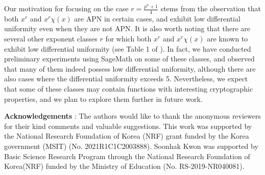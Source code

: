 \documentclass[11pt]{article}
\numberwithin{theorem}{section}
\begin{document}
Our motivation for focusing on the case $r = \frac{p^n+1}{4}$ stems from the observation that both $x^r$ and $x^r \chi(x)$ are APN in certain cases, and exhibit low differential uniformity even when they are not APN. It is also worth noting that there are several other exponent classes $r$ for which both $x^r$ and $x^r \chi(x)$ are known to exhibit low differential uniformity (see Table 1 of \cite{MW25}). In fact, we have conducted preliminary experiments using SageMath on some of these classes, and observed that many of them indeed possess low differential uniformity, although there are also cases where the differential uniformity exceeds 5. Nevertheless, we expect that some of these classes may contain functions with interesting cryptographic properties, and we plan to explore them further in future work.

\bigskip
\noindent \textbf{Acknowledgements} :
The authors would like to thank the anonymous reviewers for their kind comments and valuable suggestions. This work was supported by the National Research Foundation of Korea (NRF) grant funded by the Korea government (MSIT) (No. 2021R1C1C2003888). Soonhak Kwon was supported by Basic Science Research Program through the National Research Foundation of Korea(NRF) funded by the Ministry of Education (No. RS-2019-NR040081).
\end{document}
